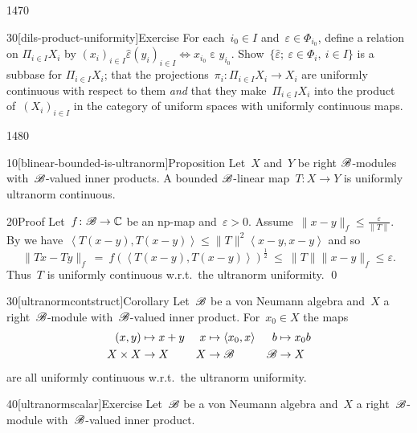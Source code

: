 \begin{parsec}{1470}
\begin{point}{30}[dils-product-uniformity]{Exercise}
    For each~$i_0 \in I$
    and~$\varepsilon \in \Phi_{i_0}$,
    define a relation on
    $\Pi_{i \in I} X_i$ by
    $(x_i)_{i \in I} \mathrel{\hat\varepsilon} (y_i)_{i \in I}
    \iff x_{i_0} \mathrel\varepsilon y_{i_0}$.
    Show~$\{ \hat\varepsilon;\ \varepsilon \in \Phi_i, \ i\in I \}$
    is a subbase for $\Pi_{i \in I} X_i$;
    that the projections~$\pi_i \colon \Pi_{i \in I} X_i \to X_i$
    are uniformly continuous with respect to them
    \emph{and} that they make~$\Pi_{i \in I} X_i$
    into the product of~$(X_i)_{i \in I}$
    in the category of uniform spaces with uniformly continuous maps.
\end{point}
\end{parsec}

\begin{parsec}{1480}%
\begin{point}{10}[blinear-bounded-is-ultranorm]{Proposition}%
Let~$X$ and~$Y$ be right $\mathscr{B}$-modules
    with~$\mathscr{B}$-valued inner products.
A bounded $\mathscr{B}$-linear map~$T\colon X \to Y$
    is uniformly ultranorm continuous.
\begin{point}{20}{Proof}%
Let~$f\colon \mathscr{B} \to \mathbb{C}$ be an np-map
    and~$\varepsilon > 0$.
Assume~$\|x-y\|_f \leq \frac{\varepsilon}{\|T\|}$.
By 
we have~$\left<T(x-y), T(x-y)\right> \leq \|T\|^2\left<x-y,x-y\right>$
and so
\begin{equation*}
    \|Tx - Ty\|_f \  =\  f(\left<T(x-y),T(x-y)\right>)^{\frac{1}{2}}
\ \leq\  \|T\| \|x-y\|_f \leq \varepsilon.
\end{equation*}
Thus~$T$ is uniformly continuous w.r.t.~the ultranorm uniformity. \qed
\end{point}
\end{point}
\begin{point}{30}[ultranormcontstruct]{Corollary}%
Let~$\mathscr{B}$ be a von Neumann algebra
    and~$X$ a right~$\mathscr{B}$-module
    with~$\mathscr{B}$-valued inner product.
For~$x_0 \in X$ the maps
\begin{align*}
    (x,y) &\mapsto x+y & x &\mapsto \left<x_0, x\right>
    & b &\mapsto x_0 b \\
    X\times X &\to X & X &\to \mathscr{B} & \mathscr{B} & \to X
\end{align*}
are all uniformly continuous w.r.t.~the ultranorm uniformity.
\end{point}
\begin{point}{40}[ultranormscalar]{Exercise}%
Let~$\mathscr{B}$ be a von Neumann algebra and~$X$ a right~$\mathscr{B}$-module
    with~$\mathscr{B}$-valued inner product.

\end{point}
\end{parsec}
